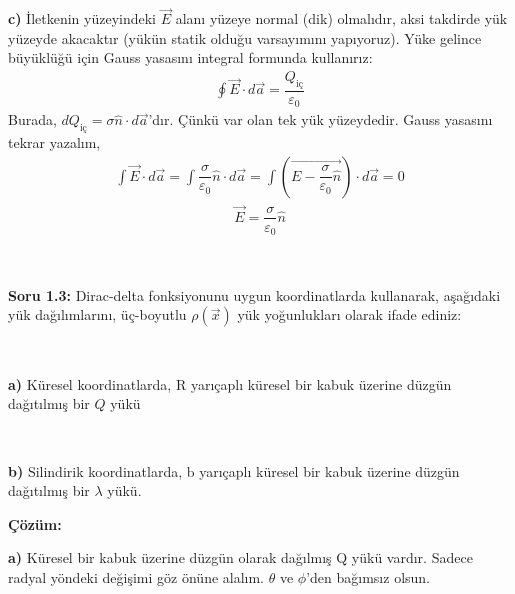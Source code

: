\textbf{c)} İletkenin yüzeyindeki $\Vec{E}$ alanı yüzeye normal (dik) olmalıdır, aksi takdirde yük yüzeyde akacaktır (yükün statik olduğu varsayımını yapıyoruz). Yüke gelince büyüklüğü için Gauss yasasını integral formunda kullanırız:
\begin{align*}
 \oint \Vec{E} \cdot d\Vec{a} = \dfrac{Q_{\textrm{iç}}}{ \varepsilon_{0}}
\end{align*}
Burada, $d{Q_\textrm{iç}} = \sigma \hat{n} \cdot d \Vec{a}$'dır. Çünkü var olan tek yük yüzeydedir. Gauss yasasını tekrar yazalım,
\begin{align*}
\int \Vec{E} \cdot d \Vec{a} = \int \dfrac{\sigma}{\varepsilon_{0}} \hat{n} \cdot d\Vec{a} = \int (\Vec{E - \dfrac{\sigma}{\varepsilon_{0}} \hat{n}}) \cdot d \Vec{a} =0 
\end{align*}
\begin{align*}
    \Vec{E} = \dfrac{\sigma}{\varepsilon_{0}} \hat{n}
\end{align*}


\


\begin{flushleft}

\newpage
\textbf{Soru 1.3:} Dirac-delta fonksiyonunu uygun koordinatlarda kullanarak, aşağıdaki yük dağılımlarını, üç-boyutlu $\rho (\Vec{x})$ yük yoğunlukları olarak ifade ediniz:

\

\textbf{a)} Küresel koordinatlarda, R yarıçaplı küresel bir kabuk üzerine düzgün dağıtılmış bir $Q$ yükü

\

\textbf{b)} Silindirik koordinatlarda, b yarıçaplı küresel bir kabuk üzerine düzgün dağıtılmış bir $\lambda$ yükü.

\end{flushleft}

  
\textbf{Çözüm:}

\textbf{a)} Küresel bir kabuk üzerine düzgün olarak dağılmış Q yükü vardır. Sadece radyal yöndeki değişimi göz önüne alalım. $\theta$ ve $\phi$'den bağımsız olsun.

